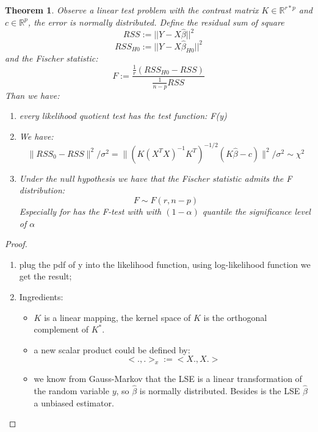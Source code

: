 \documentclass[a4paper,12pt, oneside, fleqn]{book}
\newtheorem{theorem}{Theorem}[section]
\theoremstyle{definition}
\theoremstyle{remark}
\begin{document}
\begin{theorem}
Observe a linear test problem with the contrast matrix $K \in \mathbb{R}^{r * p}$ and $c \in \mathbb{R}^{p}$, the error is normally distributed. Define the residual sum of square
\begin{equation}
    RSS := ||Y - X\hat{\beta}||^2
\end{equation}
\begin{equation}
    RSS_{H0} := ||Y - X \hat{\beta}_{H0}||^2
\end{equation}
and the Fischer statistic:
\begin{equation}
    F:= \frac{\frac{1}{r}(RSS_{H0} - RSS)}{\frac{1}{n - p}RSS}
\end{equation}
Than we have:
\begin{enumerate}
    \item every likelihood quotient test has the test function: F(y)
    \item We have:
    \begin{equation}
        \| RSS_0 - RSS \|^2 / \sigma^2 = \| (K(X^T X)^{-1}K^T)^{-1/2} (K \hat{\beta} -c) \|^2/\sigma^2 \sim \chi^2
    \end{equation}
    \item Under the null hypothesis we have that the Fischer statistic admits the F distribution:
    \begin{equation}
        F \sim F(r, n - p)
    \end{equation}
    Especially for has the F-test with with $(1 - \alpha)$ quantile the significance level of $\alpha$ 
\end{enumerate}
\end{theorem}

\begin{proof}
\begin{enumerate}
    \item plug the pdf of y into the likelihood function, using log-likelihood function we get the result;
    \item Ingredients:
    \begin{itemize}
        \item $K$ is a linear mapping, the kernel space of $K$ is the orthogonal complement of  $K^*$.
        \item a new scalar product could be defined by:
        \begin{equation}
            <. , .>_x := <X., X.>
        \end{equation}
        \item we know from Gauss-Markov that the LSE is a linear transformation of the random variable $y$, so $\hat{\beta}$ is normally distributed. Besides is the LSE $\hat{\beta}$ a unbiased estimator.
    \end{itemize}
\end{enumerate}
\end{proof}
\end{document}
